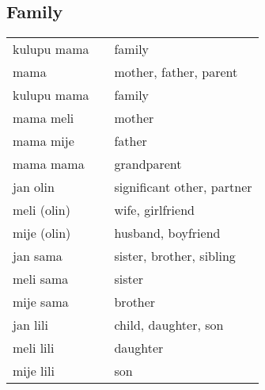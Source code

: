 \subsection{Family}
%
\begin{supertabular}{p{4,5cm}|ll}
kulupu mama && family \\
mama && mother, father, parent \\
kulupu mama && family \\
mama meli && mother \\
mama mije && father \\
mama mama && grandparent \\
jan olin && significant other, partner \\
meli (olin) && wife, girlfriend \\
mije (olin) && husband, boyfriend \\
jan sama && sister, brother, sibling \\ 
meli sama && sister \\ 
mije sama && brother \\
jan lili && child, daughter, son \\ 
meli lili && daughter \\
mije lili && son \\
\end{supertabular} \\
%
%

